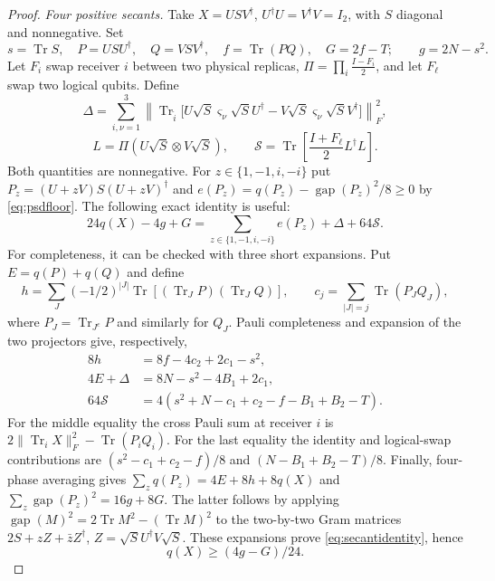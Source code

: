 \begin{proof}
\smallskip\noindent\emph{Four positive secants.}
Take $X=USV^\dagger$, $U^\dagger U=V^\dagger V=I_2$, with $S$ diagonal
and nonnegative. Set
\[
 s=\operatorname{Tr}S,\quad P=USU^\dagger,\quad Q=VSV^\dagger,
 \quad f=\operatorname{Tr}(PQ),\quad G=2f-T;
 \qquad g=2N-s^2.
\]
Let $F_i$ swap receiver $i$ between two physical replicas,
$\Pi=\prod_i\frac{I-F_i}{2}$, and let $F_\ell$ swap two logical qubits. Define
\[
 \Delta=\sum_{i,\nu=1}^3
 \left\|\operatorname{Tr}_{\widehat i}
\bigl[U\sqrt S\varsigma_\nu\sqrt S U^\dagger
       -V\sqrt S\varsigma_\nu\sqrt S V^\dagger\bigr]\right\|_F^2,
\]
\[
 L=\Pi(U\sqrt S\otimes V\sqrt S),\qquad
 \mathcal S=\operatorname{Tr}\!\left[\frac{I+F_\ell}{2}L^\dagger L\right].
\]
Both quantities are nonnegative. For $z\in\{1,-1,i,-i\}$ put
$P_z=(U+zV)S(U+zV)^\dagger$ and
$e(P_z)=q(P_z)-\operatorname{gap}(P_z)^2/8\ge0$ by \eqref{eq:psdfloor}.
The following exact identity is useful:
\begin{equation}
 24q(X)-4g+G=\sum_{z\in\{1,-1,i,-i\}}e(P_z)+\Delta+64\mathcal S.
 \label{eq:secantidentity}
\end{equation}
For completeness, it can be checked with three short expansions.
Put $E=q(P)+q(Q)$ and define
\[
 h=\sum_J(-1/2)^{|J|}\operatorname{Tr}[(\operatorname{Tr}_JP)
 (\operatorname{Tr}_JQ)],\qquad
 c_j=\sum_{|J|=j}\operatorname{Tr}(P_JQ_J),
\]
where
$P_J=\operatorname{Tr}_{J^c}P$ and similarly for $Q_J$. Pauli completeness
and expansion of the two projectors give, respectively,
\[
 \begin{aligned}
 8h&=8f-4c_2+2c_1-s^2,\\
 4E+\Delta&=8N-s^2-4B_1+2c_1,\\
 64\mathcal S&=4(s^2+N-c_1+c_2-f-B_1+B_2-T).
 \end{aligned}
\]
For the middle equality the cross Pauli sum at receiver $i$ is
$2\|\operatorname{Tr}_iX\|_F^2-\operatorname{Tr}(P_iQ_i)$.
For the last equality the identity and logical-swap contributions are
$(s^2-c_1+c_2-f)/8$ and $(N-B_1+B_2-T)/8$.
Finally, four-phase averaging gives
$\sum_z q(P_z)=4E+8h+8q(X)$ and
$\sum_z\operatorname{gap}(P_z)^2=16g+8G$.
The latter follows by applying
$\operatorname{gap}(M)^2=2\operatorname{Tr}M^2-(\operatorname{Tr}M)^2$
to the two-by-two Gram matrices
$2S+zZ+\bar zZ^\dagger$, $Z=\sqrt S U^\dagger V\sqrt S$.
These expansions prove \eqref{eq:secantidentity}, hence
\begin{equation}
 q(X)\ge(4g-G)/24.
 \label{eq:secantbound}
\end{equation}


\end{proof}
